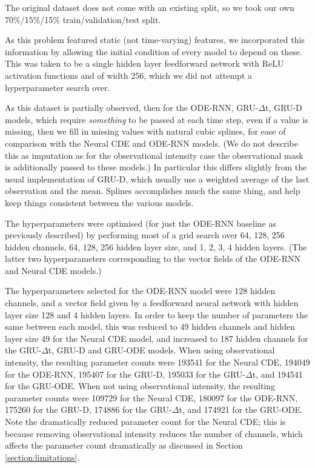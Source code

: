 \documentclass{article}
\theoremstyle{plain}
\theoremstyle{definition}
\begin{document}
	The original dataset does not come with an existing split, so we took our own 70\%/15\%/15\% train/validation/test split.
	
	As this problem featured static (not time-varying) features, we incorporated this information by allowing the initial condition of every model to depend on these. This was taken to be a single hidden layer feedforward network with ReLU activation functions and of width 256, which we did not attempt a hyperparameter search over.
	
	As this dataset is partially observed, then for the ODE-RNN, GRU-$\Delta$t, GRU-D models, which require \emph{something} to be passed at each time step, even if a value is missing, then we fill in missing values with natural cubic splines, for ease of comparison with the Neural CDE and ODE-RNN models. (We do not describe this as imputation as for the observational intensity case the observational mask is additionally passed to these models.) In particular this differs slightly from the usual implementation of GRU-D, which usually use a weighted average of the last observation and the mean. Splines accomplishes much the same thing, and help keep things consistent between the various models.
	
	The hyperparameters were optimised (for just the ODE-RNN baseline as previously described) by performing most of a grid search over 64, 128, 256 hidden channels, 64, 128, 256 hidden layer size, and 1, 2, 3, 4 hidden layers. (The latter two hyperparameters corresponding to the vector fields of the ODE-RNN and Neural CDE models.)
	
	The hyperparameters selected for the ODE-RNN model were 128 hidden channels, and a vector field given by a feedforward neural network with hidden layer size 128 and 4 hidden layers. In order to keep the number of parameters the same between each model, this was reduced to 49 hidden channels and hidden layer size 49 for the Neural CDE model, and increased to 187 hidden channels for the GRU-$\Delta$t, GRU-D and GRU-ODE models. When using observational intensity, the resulting parameter counts were 193541 for the Neural CDE, 194049 for the ODE-RNN, 195407 for the GRU-D, 195033 for the GRU-$\Delta$t, and 194541 for the GRU-ODE. When not using observational intensity, the resulting parameter counts were 109729 for the Neural CDE, 180097 for the ODE-RNN, 175260 for the GRU-D, 174886 for the GRU-$\Delta$t, and 174921 for the GRU-ODE. Note the dramatically reduced parameter count for the Neural CDE; this is because removing observational intensity reduces the number of channels, which affects the parameter count dramatically as discussed in Section \ref{section:limitations}.
	
\end{document}
